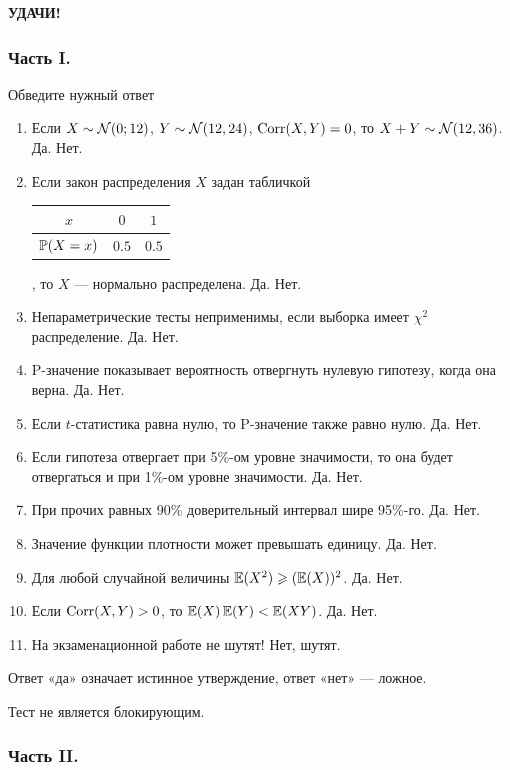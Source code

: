 \textbf{УДАЧИ!}

\subsubsection*{Часть I.}

Обведите нужный ответ

\begin{enumerate}
\item Если $X\sim \cN(0;12)$, $Y\sim \cN(12,24)$, $\Corr(X,Y)=0$, то
$X+Y\sim \cN(12,36)$.
Да. Нет.

\item Если закон распределения $X$ задан табличкой

\begin{tabular}{@{}ccc@{}}
\toprule
$x$      & $0$   & $1$   \\ \midrule
$\P(X=x)$ & $0.5$ & $0.5$ \\ \bottomrule
\end{tabular}, то $X$ — нормально распределена. Да. Нет.

\item Непараметрические тесты неприменимы, если выборка имеет
$\chi^{2}$ распределение. Да. Нет.
\item P-значение показывает вероятность отвергнуть нулевую
гипотезу, когда она верна. Да. Нет.
\item Если $t$-статистика равна нулю, то P-значение также равно
нулю. Да. Нет.
\item Если гипотеза отвергает при 5\%-ом уровне значимости, то
она будет отвергаться и при 1\%-ом уровне значимости. Да. Нет.
\item При прочих равных 90\% доверительный интервал шире 95\%-го. Да. Нет.
\item Значение функции плотности может превышать единицу. Да. Нет.
\item Для любой случайной величины  $\E(X^{2} )\ge
(\E(X))^{2}$. Да. Нет.
\item Если $\Corr(X,Y)>0$, то $\E(X)\E(Y)<\E(XY)$. Да. Нет.
\item На экзаменационной работе не шутят! Нет, шутят.
\end{enumerate}

Ответ «да» означает истинное утверждение, ответ «нет» — ложное.

Тест не является блокирующим.


\subsubsection*{Часть II.}

